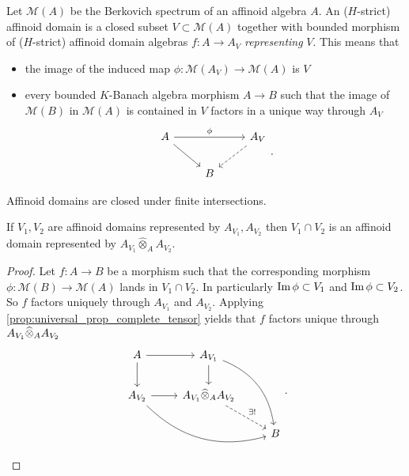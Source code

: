 \begin{definition}
	Let $\mathcal{M} (A)$ be the Berkovich spectrum of an affinoid algebra $A$. 
	An ($H$-strict) affinoid domain is a closed subset $V \subset  \mathcal{M} (A)$ together with bounded morphism of ($H$-strict) affinoid domain algebras $f:A \to A_V$ \emph{representing} $V$.
	This means that 
	\begin{itemize}
		\item the image of the induced map $\phi:\mathcal{M} (A_V) \to \mathcal{M} (A)$ is $V$ 
		\item every bounded $K$-Banach algebra morphism $A \to B$ such that the image of $\mathcal{M} (B)$ in $\mathcal{M} (A)$ is contained in $V$ factors in a unique way through $A_V$ \[
	\begin{tikzcd}
		A \ar{rr}{\phi} \ar{dr}& & A_V \ar[dashed]{dl} \\
				& B
	\end{tikzcd}
	.\] 
	\end{itemize}
\end{definition}

Affinoid domains are closed under finite intersections. 
\begin{lemma}\label{lem:intersection_affinoid_domain}
	If $V_1, V_2$ are affinoid domains represented by $A_{V_1}, A_{V_2}$ then $V_1 \cap V_2$ is an affinoid domain represented by $A_{V_1} \widehat\otimes_A A_{V_2}$. 
\end{lemma}
\begin{proof}
	Let $f: A \to B$ be a morphism such that the corresponding morphism  $\phi: \mathcal{M} (B) \to \mathcal{M}(A) $ lands in $V_1 \cap V_2$. In particularly $\im \phi \subset  V_1$ and $\im \phi \subset V_2$. 
	So $f$ factors uniquely through $A_{V_1}$ and $A_{V_2}$.
	Applying \cref{prop:universal_prop_complete_tensor} yields that  $f$ factors unique through $A_{V_1} \widehat{\otimes}_A A_{V_2}$ 
	\[
	\begin{tikzcd}
		A \rar \dar & A_{V_1} \dar \ar[bend left]{rdd} \\
		A_{V_2} \rar \ar[bend right]{drr} &  A_{V_1} \cox_A A_{V_2} \ar[dashed]{dr}{\exists !} \\
		 & & B
	\end{tikzcd}
	.\] 
\end{proof}

